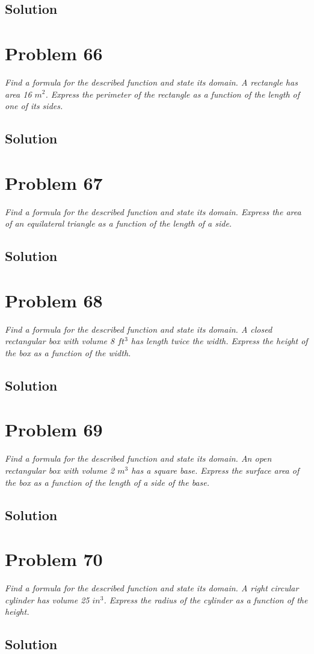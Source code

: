 \documentclass[11pt]{article}
\newcommand{\soln}{\subsection*}
\newcommand{\qn}{\textit}
\begin{document}
\soln{Solution}

\section*{Problem 66}

\qn{Find a formula for the described function and state its domain. A rectangle has area 16 $m^2$. Express the perimeter of the rectangle as a function of the length of one of its sides.}

\soln{Solution}

\section*{Problem 67}

\qn{Find a formula for the described function and state its domain. Express the area of an equilateral triangle as a function of the length of a side.}

\soln{Solution}

\section*{Problem 68}

\qn{Find a formula for the described function and state its domain. A closed rectangular box with volume 8 $ft^3$ has length twice the width. Express the height of the box as a function of the width.}

\soln{Solution}

\section*{Problem 69}

\qn{Find a formula for the described function and state its domain. An open rectangular box with volume 2 $m^3$ has a square base. Express the surface area of the box as a function of the length of a side of the base.}

\soln{Solution}

\section*{Problem 70}

\qn{Find a formula for the described function and state its domain. A right circular cylinder has volume 25 $in^3$. Express the radius of the cylinder as a function of the height.}

\soln{Solution}
\end{document}
